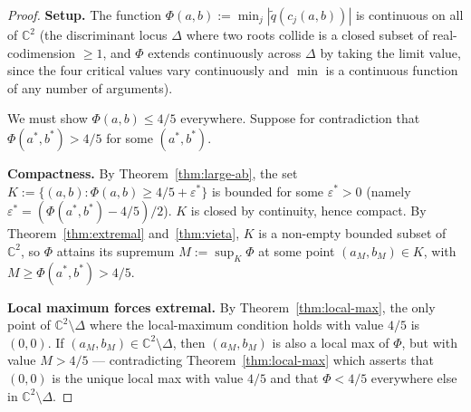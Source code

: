 \documentclass[11pt,a4paper]{article}
\begin{document}
\begin{proof}
\textbf{Setup.} The function $\Phi(a, b) := \min_j |\tilde{q}(c_j(a, b))|$ is continuous on all of $\mathbb{C}^2$ (the discriminant locus $\Delta$ where two roots collide is a closed subset of real-codimension $\ge 1$, and $\Phi$ extends continuously across $\Delta$ by taking the limit value, since the four critical values vary continuously and $\min$ is a continuous function of any number of arguments).

We must show $\Phi(a, b) \le 4/5$ everywhere. Suppose for contradiction that $\Phi(a^*, b^*) > 4/5$ for some $(a^*, b^*)$.

\textbf{Compactness.} By Theorem~\ref{thm:large-ab}, the set $K := \{(a, b) : \Phi(a, b) \ge 4/5 + \varepsilon^*\}$ is bounded for some $\varepsilon^* > 0$ (namely $\varepsilon^* = (\Phi(a^*, b^*) - 4/5)/2$). $K$ is closed by continuity, hence compact. By Theorem~\ref{thm:extremal} and~\ref{thm:vieta}, $K$ is a non-empty bounded subset of $\mathbb{C}^2$, so $\Phi$ attains its supremum $M := \sup_K \Phi$ at some point $(a_M, b_M) \in K$, with $M \ge \Phi(a^*, b^*) > 4/5$.

\textbf{Local maximum forces extremal.} By Theorem~\ref{thm:local-max}, the only point of $\mathbb{C}^2 \setminus \Delta$ where the local-maximum condition holds with value $4/5$ is $(0, 0)$. If $(a_M, b_M) \in \mathbb{C}^2 \setminus \Delta$, then $(a_M, b_M)$ is also a local max of $\Phi$, but with value $M > 4/5$ --- contradicting Theorem~\ref{thm:local-max} which asserts that $(0, 0)$ is the unique local max with value $4/5$ and that $\Phi < 4/5$ everywhere else in $\mathbb{C}^2 \setminus \Delta$.


\end{proof}
\end{document}
